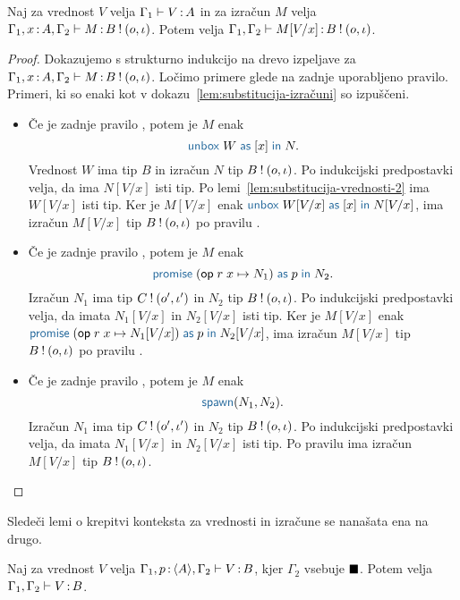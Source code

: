 \begin{lema}\label{lem:substitucija-izračuni-2}
	Naj za vrednost $V$ velja $\Gamma_1 \vdash V \mathinner{:} A$ in za izračun $M$ velja $\Gamma_1, x \mathinner{:} A, \Gamma_2 \vdash M \mathinner{:} B \mathbin{!} (o, \iota)$. Potem velja $\Gamma_1, \Gamma_2 \vdash M[V/x] \mathinner{:} B \mathbin{!} (o, \iota)$.
\end{lema}

\begin{proof}
	Dokazujemo s strukturno indukcijo na drevo izpeljave za $\Gamma_1, x \mathinner{:} A, \Gamma_2 \vdash M \mathinner{:} B \mathbin{!} (o, \iota)$.
	Ločimo primere glede na zadnje uporabljeno pravilo.
	Primeri, ki so enaki kot v dokazu~\ref{lem:substitucija-izračuni} so izpuščeni.
	
	\begin{itemize}
		\item Če je zadnje pravilo , potem je $M$ enak $$\tmunbox{W}{x}{N}.$$ Vrednost $W$ ima tip $B$ in izračun $N$ tip $B \mathbin{!} (o, \iota)$.
		Po indukcijski predpostavki velja, da ima $N[V/x]$ isti tip. Po lemi~\ref{lem:substitucija-vrednosti-2} ima $W[V/x]$ isti tip. Ker je $M[V/x]$ enak $\tmunbox{W[V/x]}{x}{N[V/x]}$, ima izračun $M[V/x]$ tip $B \mathbin{!} (o, \iota)$ po pravilu .
		
		\item Če je zadnje pravilo , potem je $M$ enak $$\tmwithrec{op}{r}{x}{N_1}{p}{N_2}.$$ Izračun $N_1$ ima tip $C \mathbin{!} (o', \iota')$ in $N_2$ tip $B \mathbin{!} (o, \iota)$.
		Po indukcijski predpostavki velja, da imata $N_1[V/x]$ in $N_2[V/x]$ isti tip. Ker je $M[V/x]$ enak $\tmwithrec{op}{r}{x}{N_1[V/x]}{p}{N_2[V/x]}$, ima izračun $M[V/x]$ tip $B \mathbin{!} (o, \iota)$ po pravilu .
		
		\item Če je zadnje pravilo , potem je $M$ enak $$\tmspawn{N_1}{N_2}.$$ Izračun $N_1$ ima tip $C \mathbin{!} (o', \iota')$ in $N_2$ tip $B \mathbin{!} (o, \iota)$.
		Po indukcijski predpostavki velja, da imata $N_1[V/x]$ in $N_2[V/x]$ isti tip. Po pravilu  ima izračun $M[V/x]$ tip $B \mathbin{!} (o, \iota)$.	
	\end{itemize}
	
\end{proof}

Sledeči lemi o krepitvi konteksta za vrednosti in izračune se nanašata ena na drugo.

\begin{lema}\label{lem:strengthening-values-promise}
	Naj za vrednost $V$ velja $\Gamma_1, p \mathinner{:} \langle A \rangle, \Gamma_2 \vdash V \mathinner{:} B$, kjer $\Gamma_2$ vsebuje $\blacksquare$. Potem velja $\Gamma_1, \Gamma_2 \vdash V \mathinner{:} B$.
\end{lema}

